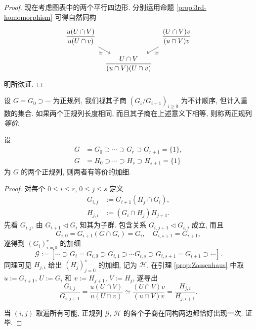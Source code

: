 \begin{proof}
	现在考虑图表中的两个平行四边形. 分别运用命题 \ref{prop:3rd-homomorphism} 可得自然同构
	\begin{equation*}\begin{tikzcd}[column sep=tiny, row sep=small]
		\dfrac{u (U \cap V)}{u(U \cap v)} \arrow[rd, "\simeq"'] &  & \dfrac{(U \cap V)v}{(u \cap V)v} \arrow[ld, "\simeq"] \\
		& \dfrac{U \cap V}{(u \cap V)(U \cap v)} &
	\end{tikzcd}\end{equation*}
	明所欲证.
\end{proof}

\begin{definition}\label{def:JH-subquotients}
	设 $G = G_0 \supset \cdots$ 为正规列, 我们视其子商 $(G_i/G_{i+1})_{i \geq 0}$ 为不计顺序, 但计入重数的集合. 如果两个正规列长度相同, 而且其子商在上述意义下相等, 则称两正规列\emph{等价}.
\end{definition}

\begin{theorem}\label{prop:Schreier}
	设
	\begin{align*}
		G & = G_0 \supset \cdots \supset G_r \supset G_{r+1} = \{1\}, \\
		G & = H_0 \supset \cdots \supset H_s \supset H_{s+1} = \{1\}
	\end{align*}
	为 $G$ 的两个正规列, 则两者有等价的加细.
\end{theorem}
\begin{proof}
	对每个 $0 \leq i \leq r$, $0 \leq j \leq s$ 定义
	\begin{align*}
		G_{i,j} & := G_{i+1} (H_j \cap G_i), \\
		H_{j,i} & := (G_i \cap H_j) H_{j+1}.
	\end{align*}
	先看 $G_{i,j}$, 由 $G_{i+1} \lhd G_i$ 知其为子群. 包含关系 $G_{i, j+1} \lhd G_{i,j}$ 成立, 而且
	\[ G_{i,0} = G_{i+1} (G \cap G_i) = G_i, \quad G_{i,s+1} = G_{i+1}, \]
	遂得到 $(G_i)_{i=0}^r$ 的加细
	\[ \mathcal{G} := \left[ \cdots \supset G_i = G_{i, 0} \supset G_{i, 1} \supset \cdots G_{i, s} \supset G_{i, s+1}= G_{i+1} \supset \cdots \right] . \]
	同理可见 $H_{j, i}$ 给出 $(H_j)_{j=0}^s$ 的加细, 记为 $\mathcal{H}$. 在引理 \ref{prop:Zassenhaus} 中取 $u := G_{i+1}$, $U := G_i$ 和 $v := H_{j+1}$, $V := H_j$, 遂导出
	\[ \dfrac{G_{i,j}}{G_{i,j+1}} = \dfrac{u(U \cap V)}{u(U \cap v)} \simeq \dfrac{(U \cap V)v}{(u \cap V)v} = \dfrac{H_{j,i}}{H_{j,i+1}}. \]

	当 $(i,j)$ 取遍所有可能, 正规列 $\mathcal{G}$, $\mathcal{H}$ 的各个子商在同构两边都恰好出现一次. 证毕.
\end{proof}

